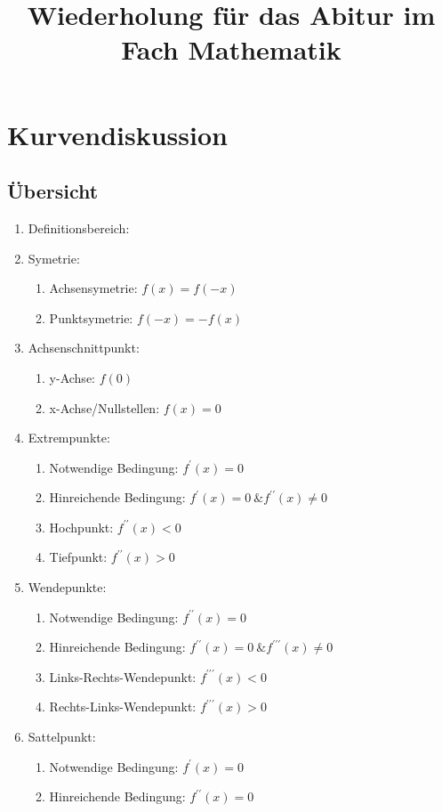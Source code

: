 \documentclass[a4paper,12pt]{article}
\title{Wiederholung für das Abitur im Fach Mathematik}
\date{}
\begin{document}
\maketitle
\tableofcontents
{}
\section*{Kurvendiskussion}
	\subsection*{Übersicht}
		\begin{enumerate}
			\item Definitionsbereich:
			\item Symetrie:
				\begin{enumerate}
					\item Achsensymetrie: $f(x)=f(-x)$
					\item Punktsymetrie: $f(-x) = -f(x)$
				\end{enumerate}
			\item Achsenschnittpunkt:
				\begin{enumerate}
					\item y-Achse: $f(0)$
					\item x-Achse/Nullstellen: $f(x)=0$
				\end{enumerate}
			\item Extrempunkte:
				\begin{enumerate}
					\item Notwendige Bedingung: $f^{\prime}(x)=0$
					\item Hinreichende Bedingung: $f^{\prime}(x)=0 \ \& f^{\prime\prime}(x) \neq0$
					\item Hochpunkt: $f^{\prime\prime}(x) < 0$
					\item Tiefpunkt: $f^{\prime\prime}(x)>0$
				\end{enumerate}
			\item Wendepunkte:
				\begin{enumerate}
					\item Notwendige Bedingung: $f^{\prime\prime}(x)=0$
					\item Hinreichende Bedingung: $f^{\prime\prime}(x)=0 \ \& f^{\prime\prime\prime}(x) \neq0$
					\item Links-Rechts-Wendepunkt: $f^{\prime\prime\prime}(x) < 0$
					\item Rechts-Links-Wendepunkt: $f^{\prime\prime\prime}(x)>0$
				\end{enumerate}
			\item Sattelpunkt:
				\begin{enumerate}
					\item Notwendige Bedingung: $f^{\prime}(x)=0$
					\item Hinreichende Bedingung: $f^{\prime\prime}(x)=0$
				\end{enumerate}
		\end{enumerate}
\end{document}
